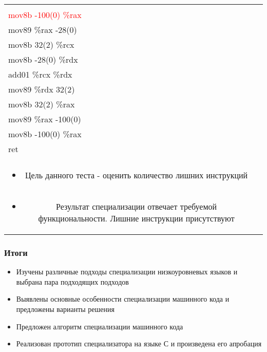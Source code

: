 \documentclass{beamer}
\begin{document}
\begin{frame}[fragile]
\begin{tabular}{l  c  r}
{\begin{minipage}[c]{0.4\textwidth}
{\textcolor{red}{mov89 \%rax  -100(0)}\\ 
\textcolor{red}{mov8b -100(0)  \%rax}\\ 
\textcolor{ao}{mov89 \%rax  -28(0)}\\ 
\textcolor{ao}{mov8b 32(2)  \%rcx}\\ 
\textcolor{ao}{mov8b -28(0)  \%rdx}\\ 
\textcolor{ao}{add01 \%rcx  \%rdx}\\ 
\textcolor{ao}{mov89 \%rdx  32(2)}\\ 
mov8b 32(2)  \%rax \\
mov89 \%rax  -100(0)\\ 
mov8b -100(0)  \%rax \\
ret\\
}
\vspace*{20mm}
\end{minipage}
}\\
 \multicolumn{2}{c}{
\begin{minipage}[c]{0.7\textwidth}
\begin{itemize}
\vfill
\item Цель данного теста - 
оценить количество лишних инструкций
\vspace*{5mm}
\end{itemize}
\end{minipage}}
 & \\
\multicolumn{2}{c}{
\begin{minipage}[c]{0.7\textwidth}
\begin{itemize}
\vfill
\item Результат специализации отвечает требуемой функциональности. Лишние инструкции присутствуют
\end{itemize}
\end{minipage}}  & \\
\end{tabular}
\vfill
\end{frame}


\begin{frame}\frametitle{Итоги}
\begin{itemize}
\item Изучены различные подходы специализации низкоуровневых языков и выбрана пара подходящих подходов
\vfill
\item Выявлены основные особенности специализации машинного кода и предложены варианты решения
\vfill
\item Предложен алгоритм специализации машинного кода
\vfill
\item Реализован прототип специализатора на языке С и произведена его апробация
\vfill
\end{itemize}
\end{frame}
\end{document}
